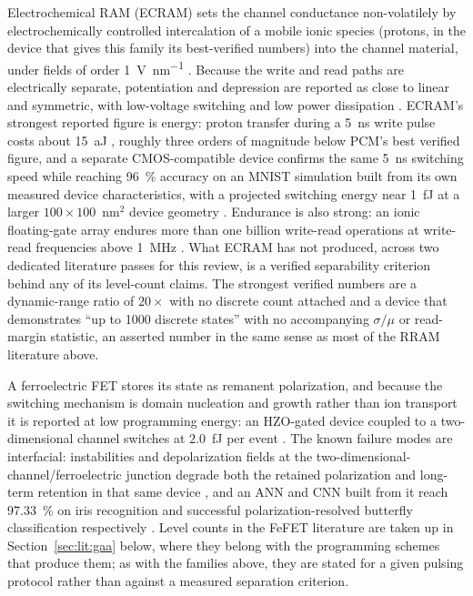 Electrochemical RAM (ECRAM) sets the channel conductance non-volatilely by
electrochemically controlled intercalation of a mobile ionic species (protons, in the
device that gives this family its best-verified numbers) into the channel material,
under fields of order \SI{1}{\volt\per\nano\metre} \cite{Onen2022_Science}. Because the
write and read paths are electrically separate, potentiation and depression are reported
as close to linear and symmetric, with low-voltage switching and low power dissipation
\cite{Fuller2017_AdvMat}. ECRAM's strongest reported figure is energy: proton transfer during a
\SI{5}{\nano\second} write pulse costs about \SI{15}{\atto\joule}
\cite{Onen2022_Science}, roughly three orders of magnitude below PCM's best verified
figure, and a separate CMOS-compatible device confirms the same \SI{5}{\nano\second}
switching speed while reaching \SI{96}{\percent} accuracy on an MNIST simulation built
from its own measured device characteristics, with a projected switching energy near
\SI{1}{\femto\joule} at a larger $100\times100$~nm$^2$ device geometry
\cite{Tang2018_IEDM}. Endurance is also strong: an ionic floating-gate array endures
more than one billion write-read operations at write-read frequencies above
\SI{1}{\mega\hertz} \cite{Fuller2019_Science}. What ECRAM has not produced, across two
dedicated literature passes for this review, is a verified separability criterion behind
any of its level-count claims. The strongest verified numbers are a dynamic-range ratio
of $20\times$ with no discrete count attached \cite{Onen2022_Science} and a device that
demonstrates ``up to 1000 discrete states'' \cite{Tang2018_IEDM} with no accompanying
$\sigma/\mu$ or read-margin statistic, an asserted number in the same sense as most of
the RRAM literature above.

A ferroelectric FET stores its state as remanent polarization, and because the
switching mechanism is domain nucleation and growth rather than ion transport it is
reported at low programming energy: an HZO-gated device coupled to a two-dimensional
 channel switches at \SI{2.0}{\femto\joule} per event
\cite{Huo2026_NatComm}. The known failure modes are interfacial: instabilities and
depolarization fields at the two-dimensional-channel/ferroelectric junction degrade both
the retained polarization and long-term retention in that same device
\cite{Huo2026_NatComm}, and an ANN and CNN built from it reach \SI{97.33}{\percent} on
iris recognition and successful polarization-resolved butterfly classification
respectively \cite{Huo2026_NatComm}. Level counts in the FeFET literature are taken up in
Section~\ref{sec:lit:gaa} below, where they belong with the programming schemes that
produce them; as with the families above, they are stated for a given pulsing protocol
rather than against a measured separation criterion.

